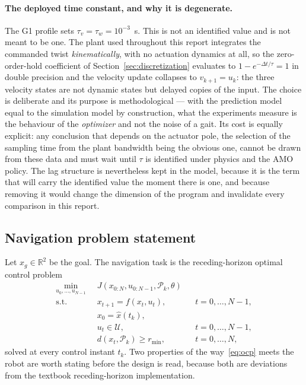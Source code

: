 \documentclass[11pt,a4paper]{article}
\newcommand{\R}{\mathbb{R}}
\begin{document}
\paragraph{The deployed time constant, and why it is degenerate.} The G1 profile sets
$\tau_v=\tau_w=10^{-3}$~s. This is not an identified value and is not meant to be one. The plant used
throughout this report integrates the commanded twist \emph{kinematically}, with no actuation dynamics at
all, so the zero-order-hold coefficient of Section~\ref{sec:discretization} evaluates to
$1-e^{-\Delta t/\tau}=1$ in double precision and the velocity update collapses to $v_{k+1}=u_k$: the three
velocity states are not dynamic states but delayed copies of the input. The choice is deliberate and its
purpose is methodological --- with the prediction model equal to the simulation model by construction, what
the experiments measure is the behaviour of the \emph{optimizer} and not the noise of a gait. Its cost is
equally explicit: any conclusion that depends on the actuator pole, the selection of the sampling time from
the plant bandwidth being the obvious one, cannot be drawn from these data and must wait until $\tau$ is
identified under physics and the AMO policy. The lag structure is nevertheless kept in the model, because it
is the term that will carry the identified value the moment there is one, and because removing it would
change the dimension of the program and invalidate every comparison in this report.

\subsection{Navigation problem statement}
\label{sec:statement}

Let $x_g\in\R^2$ be the goal. The navigation task is the receding-horizon optimal control problem
\begin{subequations}
\label{eq:ocp}
\begin{align}
  \min_{u_0,\dots,u_{N-1}}\;\; & J\!\left(x_{0:N},u_{0:N-1},\mathcal{P}_k,\theta\right) \label{eq:ocp-cost}\\
  \text{s.t.}\quad & x_{t+1}=f(x_t,u_t), && t=0,\dots,N-1, \label{eq:ocp-dyn}\\
                   & x_0 = \hat x(t_k), \label{eq:ocp-init}\\
                   & u_t\in\mathcal{U}, && t=0,\dots,N-1, \label{eq:ocp-input}\\
                   & d\!\left(x_t,\mathcal{P}_k\right)\ge r_{\min}, && t=0,\dots,N, \label{eq:ocp-obs}
\end{align}
\end{subequations}
solved at every control instant $t_k$. Two properties of the way~\eqref{eq:ocp} meets the robot are worth
stating before the design is read, because both are deviations from the textbook receding-horizon
implementation.
\end{document}
